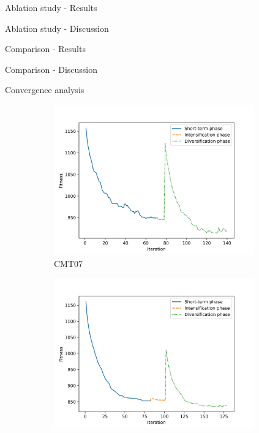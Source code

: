 \documentclass[9pt]{beamer}
\begin{document}
\begin{frame}{Ablation study - Results}

\end{frame}

\begin{frame}{Ablation study - Discussion}

\end{frame}

\begin{frame}{Comparison - Results}

\end{frame}

\begin{frame}{Comparison - Discussion}

\end{frame}

\begin{frame}{Convergence analysis}
\begin{figure}[ht]
    \centering
    \begin{subfigure}[b]{0.48\linewidth}
        \centering
        \includegraphics[width=0.95\textwidth]{images/converge_1.jpg}
        \caption{CMT07}
    \end{subfigure}
    \begin{subfigure}[b]{0.48\linewidth}
        \centering
        \includegraphics[width=0.95\textwidth]{images/converge_2.jpg}

\end{subfigure}
\end{figure}
\end{frame}
\end{document}

